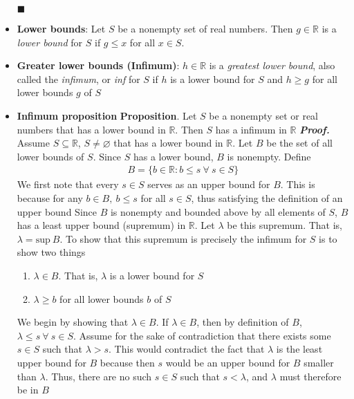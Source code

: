 \documentclass{report}
\begin{document}
\begin{itemize}
            \hspace*{\fill} $\blacksquare$
        \item \textbf{Lower bounds}: Let $S$ be a nonempty set of real numbers. Then $g\in \mathbb{R}$ is a \textit{lower bound} for $S$ if $g \leq x$ for all $x\in S$.
        \item \textbf{Greater lower bounds (Infimum)}: $h\in \mathbb{R}$ is a \textit{greatest lower bound}, also called the \textit{infimum}, or \textit{inf} for $S$ if $ h$ is a lower bound for $S$ and $h \geq g$ for all lower bounds $g$ of $S$
        \item \textbf{Infimum proposition}
            \bigbreak \noindent 
            \textbf{Proposition}. Let $S$ be a nonempty set or real numbers that has a lower bound in $\mathbb{R}$. Then $S$ has a infimum in $\mathbb{R}$
            \bigbreak \noindent 
            \textbf{\textit{Proof.}} Assume $S \subseteq \mathbb{R}$, $S\ne \varnothing$ that has a lower bound in $\mathbb{R}$.
            \bigbreak \noindent 
            Let $B$ be the set of all lower bounds of $S$. Since $S$ has a lower bound, $B$ is nonempty. Define
            \begin{align*}
                B = \{b \in \mathbb{R}: b \leq s \ \forall \ s \in S\}
            \end{align*}
            \bigbreak \noindent 
            We first note that every $s \in S$ serves as an upper bound for $B$. This is because for any $b\in B,\ b \leq s$ for all $s\in S$, thus satisfying the definition of an upper bound
            \bigbreak \noindent 
            Since $B$ is nonempty and bounded above by all elements of $S$, $B$ has a least upper bound (supremum) in $\mathbb{R}$. Let $\lambda$ be this supremum. That is, $\lambda = \text{sup}\ B$. To show that this supremum is precisely the infimum for $S$ is to show two things
            \begin{enumerate}
                \item $\lambda \in B$. That is, $\lambda$ is a lower bound for $S$
                \item $\lambda \geq b$ for all lower bounds $b $ of $S$
            \end{enumerate}
            We begin by showing that $\lambda \in B$. If $\lambda \in B$, then by definition of $B$, $ \lambda \leq s \ \forall \ s \in S$. Assume for the sake of contradiction that there exists some $s \in S$ such that $\lambda > s$. This would contradict the fact that $\lambda$ is the least upper bound for $B$ because then $s$ would be an upper bound for $B$ smaller than $\lambda$. Thus, there are no such $s\in S$ such that $s < \lambda$, and $\lambda$ must therefore be in $B$

\end{itemize}
\end{document}
